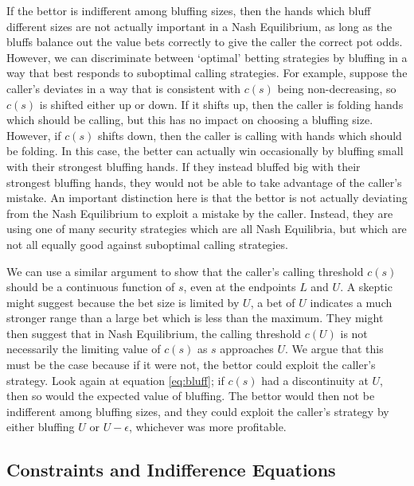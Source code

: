 \documentclass[a4paper,12pt]{article}
\theoremstyle{plain}
\theoremstyle{definition}
\begin{document}
If the bettor is indifferent among bluffing sizes, then the hands which bluff different sizes are not actually important in a Nash Equilibrium, as long as the bluffs balance out the value bets correctly to give the caller the correct pot odds. However, we can discriminate between `optimal' betting strategies by bluffing in a way that best responds to suboptimal calling strategies. For example, suppose the caller's deviates in a way that is consistent with $c(s)$ being non-decreasing, so $c(s)$ is shifted either up or down. If it shifts up, then the caller is folding hands which should be calling, but this has no impact on choosing a bluffing size. However, if $c(s)$ shifts down, then the caller is calling with hands which should be folding. In this case, the better can actually win occasionally by bluffing small with their strongest bluffing hands. If they instead bluffed big with their strongest bluffing hands, they would not be able to take advantage of the caller's mistake. An important distinction here is that the bettor is not actually deviating from the Nash Equilibrium to exploit a mistake by the caller. Instead, they are using one of many security strategies which are all Nash Equilibria, but which are not all equally good against suboptimal calling strategies. 

We can use a similar argument to show that the caller's calling threshold $c(s)$ should be a continuous function of $s$, even at the endpoints $L$ and $U$. A skeptic might suggest because the bet size is limited by $U$, a bet of $U$ indicates a much stronger range than a large bet which is less than the maximum. They might then suggest that in Nash Equilibrium, the calling threshold $c(U)$ is not necessarily the limiting value of $c(s)$ as $s$ approaches $U$. We argue that this must be the case because if it were not, the bettor could exploit the caller's strategy. Look again at equation \ref{eq:bluff}; if $c(s)$ had a discontinuity at $U$, then so would the expected value of bluffing. The bettor would then not be indifferent among bluffing sizes, and they could exploit the caller's strategy by either bluffing $U$ or $U-\epsilon$, whichever was more profitable.\\







\subsection{Constraints and Indifference Equations}
\end{document}
